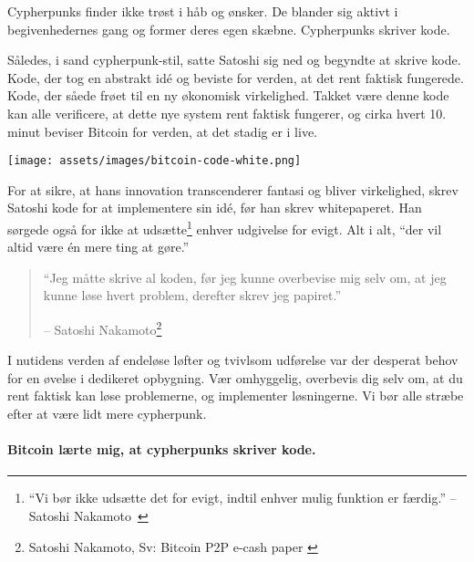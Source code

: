 Cypherpunks finder ikke trøst i håb og ønsker. De blander sig aktivt
i begivenhedernes gang og former deres egen skæbne.
Cypherpunks skriver kode.

Således, i sand cypherpunk-stil, satte Satoshi sig ned og begyndte at skrive
kode. Kode, der tog en abstrakt idé og beviste for verden, at det rent faktisk fungerede. Kode, der såede frøet til en ny økonomisk virkelighed.
Takket være denne kode kan alle verificere, at dette nye system rent faktisk
fungerer, og cirka hvert 10. minut beviser Bitcoin for verden, at det stadig er i live.

\begin{center}
  \texttt{[image: assets/images/bitcoin-code-white.png]}
  \label{fig:bitcoin-code-white}
\end{center}

For at sikre, at hans innovation transcenderer fantasi og bliver virkelighed, skrev Satoshi
kode for at implementere sin idé, før han skrev whitepaperet. Han sørgede også for ikke at udsætte\footnote{\enquote{Vi bør ikke udsætte det for evigt, indtil enhver mulig
funktion er færdig.} -- Satoshi Nakamoto~\cite{satoshi-delay}} enhver udgivelse for evigt.
Alt i alt, \enquote{der vil altid være én mere ting at gøre.}

\begin{quotation}\begin{samepage}
\enquote{Jeg måtte skrive al koden, før jeg kunne overbevise mig selv om, at jeg
kunne løse hvert problem, derefter skrev jeg papiret.}
\begin{flushright} -- Satoshi Nakamoto\footnote{Satoshi Nakamoto, Sv: Bitcoin P2P e-cash paper \cite{satoshi-mail-code-first}}
\end{flushright}\end{samepage}\end{quotation}

I nutidens verden af endeløse løfter og tvivlsom udførelse var der desperat behov for en øvelse
i dedikeret opbygning. Vær omhyggelig, overbevis
dig selv om, at du rent faktisk kan løse problemerne, og implementer
løsningerne. Vi bør alle stræbe efter at være lidt mere cypherpunk.

\paragraph{Bitcoin lærte mig, at cypherpunks skriver kode.}

%
%
%
%
